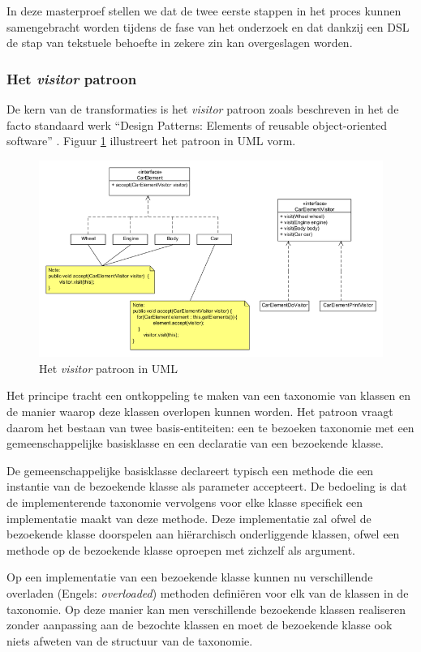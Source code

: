 In deze masterproef stellen we dat de twee eerste stappen in het proces kunnen
samengebracht worden tijdens de fase van het onderzoek en dat dankzij een DSL
de stap van tekstuele behoefte in zekere zin kan overgeslagen worden.

\subsubsection{Het \emph{visitor} patroon}
\label{subsubsection:devel-visitor-pattern}

De kern van de transformaties is het \emph{visitor} patroon zoals beschreven in
het de facto standaard werk ``Design Patterns: Elements of reusable
object-oriented software'' \citep{gamma1994design}. Figuur \ref{fig:visitor}
illustreert het patroon in UML vorm.

\begin{figure}[ht]
  \centering
  \includegraphics[width=0.7\linewidth]{resources/visitor.png}
  \caption{Het \emph{visitor} patroon in UML}
  \label{fig:visitor}
\end{figure}

Het principe tracht een ontkoppeling te maken van een taxonomie van klassen en
de manier waarop deze klassen overlopen kunnen worden. Het patroon vraagt
daarom het bestaan van twee basis-entiteiten: een te bezoeken taxonomie met een
gemeenschappelijke basisklasse en een declaratie van een bezoekende klasse.

De gemeenschappelijke basisklasse declareert typisch een methode 
die een instantie van de bezoekende klasse als parameter accepteert. De
bedoeling is dat de implementerende taxonomie vervolgens voor elke klasse
specifiek een implementatie maakt van deze methode. Deze implementatie zal
ofwel de bezoekende klasse doorspelen aan hi\"erarchisch onderliggende klassen,
ofwel een  methode op de bezoekende klasse oproepen met zichzelf als
argument.

Op een implementatie van een bezoekende klasse kunnen nu verschillende
overladen (Engels: \emph{overloaded}) methoden defini\"eren voor elk van de
klassen in de taxonomie. Op deze manier kan men verschillende bezoekende
klassen realiseren zonder aanpassing aan de bezochte klassen en moet de
bezoekende klasse ook niets afweten van de structuur van de taxonomie.

